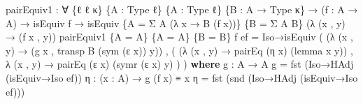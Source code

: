 \documentclass[
  11pt,
  oneside,
  article]{memoir}
\newenvironment{Shaded}{}{}
\newcommand{\KeywordTok}[1]{\textcolor[rgb]{0.00,0.44,0.13}{\textbf{#1}}}
\newcommand{\NormalTok}[1]{#1}
\newcommand{\OtherTok}[1]{\textcolor[rgb]{0.00,0.44,0.13}{#1}}
\theoremstyle{definition}
\theoremstyle{plain}
\newcommand{\0}{\textsf{0}}
\newcommand{\1}{\tn{\textsf{1}}}
\begin{document}
\begin{Shaded}
\begin{Highlighting}[]
\NormalTok{pairEquiv1 }\OtherTok{:} \OtherTok{∀} \OtherTok{\{}\NormalTok{ℓ ℓ\textquotesingle{} κ}\OtherTok{\}} \OtherTok{\{}\NormalTok{A }\OtherTok{:}\NormalTok{ Type ℓ}\OtherTok{\}} \OtherTok{\{}\NormalTok{A\textquotesingle{} }\OtherTok{:}\NormalTok{ Type ℓ\textquotesingle{}}\OtherTok{\}} \OtherTok{\{}\NormalTok{B }\OtherTok{:}\NormalTok{ A\textquotesingle{} }\OtherTok{→}\NormalTok{ Type κ}\OtherTok{\}}
             \OtherTok{→} \OtherTok{(}\NormalTok{f }\OtherTok{:}\NormalTok{ A }\OtherTok{→}\NormalTok{ A\textquotesingle{}}\OtherTok{)} \OtherTok{→}\NormalTok{ isEquiv f}
             \OtherTok{→}\NormalTok{ isEquiv }\OtherTok{\{}\NormalTok{A }\OtherTok{=}\NormalTok{ Σ A }\OtherTok{(λ}\NormalTok{ x }\OtherTok{→}\NormalTok{ B }\OtherTok{(}\NormalTok{f x}\OtherTok{))\}} \OtherTok{\{}\NormalTok{B }\OtherTok{=}\NormalTok{ Σ A\textquotesingle{} B}\OtherTok{\}} 
                       \OtherTok{(λ} \OtherTok{(}\NormalTok{x , y}\OtherTok{)} \OtherTok{→} \OtherTok{(}\NormalTok{f x , y}\OtherTok{))}
\NormalTok{pairEquiv1 }\OtherTok{\{}\NormalTok{A }\OtherTok{=}\NormalTok{ A}\OtherTok{\}} \OtherTok{\{}\NormalTok{A\textquotesingle{} }\OtherTok{=}\NormalTok{ A\textquotesingle{}}\OtherTok{\}} \OtherTok{\{}\NormalTok{B }\OtherTok{=}\NormalTok{ B}\OtherTok{\}}\NormalTok{ f ef }\OtherTok{=}
\NormalTok{  Iso→isEquiv}
    \OtherTok{(} \OtherTok{(λ} \OtherTok{(}\NormalTok{x , y}\OtherTok{)} \OtherTok{→} \OtherTok{(}\NormalTok{g x , transp B }\OtherTok{(}\NormalTok{sym }\OtherTok{(}\NormalTok{ε x}\OtherTok{))}\NormalTok{ y}\OtherTok{))}
\NormalTok{    , }\OtherTok{(} \OtherTok{(λ} \OtherTok{(}\NormalTok{x , y}\OtherTok{)} \OtherTok{→}\NormalTok{ pairEq }\OtherTok{(}\NormalTok{η x}\OtherTok{)} \OtherTok{(}\NormalTok{lemma x y}\OtherTok{))} 
\NormalTok{      , }\OtherTok{λ} \OtherTok{(}\NormalTok{x , y}\OtherTok{)} \OtherTok{→}\NormalTok{ pairEq }\OtherTok{(}\NormalTok{ε x}\OtherTok{)} \OtherTok{(}\NormalTok{symr }\OtherTok{(}\NormalTok{ε x}\OtherTok{)}\NormalTok{ y}\OtherTok{)} \OtherTok{)} \OtherTok{)}
  \KeywordTok{where}
\NormalTok{    g }\OtherTok{:}\NormalTok{ A\textquotesingle{} }\OtherTok{→}\NormalTok{ A}
\NormalTok{    g }\OtherTok{=}\NormalTok{ fst }\OtherTok{(}\NormalTok{Iso→HAdj }\OtherTok{(}\NormalTok{isEquiv→Iso ef}\OtherTok{))}
\NormalTok{    η }\OtherTok{:} \OtherTok{(}\NormalTok{x }\OtherTok{:}\NormalTok{ A}\OtherTok{)} \OtherTok{→}\NormalTok{ g }\OtherTok{(}\NormalTok{f x}\OtherTok{)}\NormalTok{ ≡ x}
\NormalTok{    η }\OtherTok{=}\NormalTok{ fst }\OtherTok{(}\NormalTok{snd }\OtherTok{(}\NormalTok{Iso→HAdj }\OtherTok{(}\NormalTok{isEquiv→Iso ef}\OtherTok{)))}

\end{Highlighting}
\end{Shaded}
\end{document}
